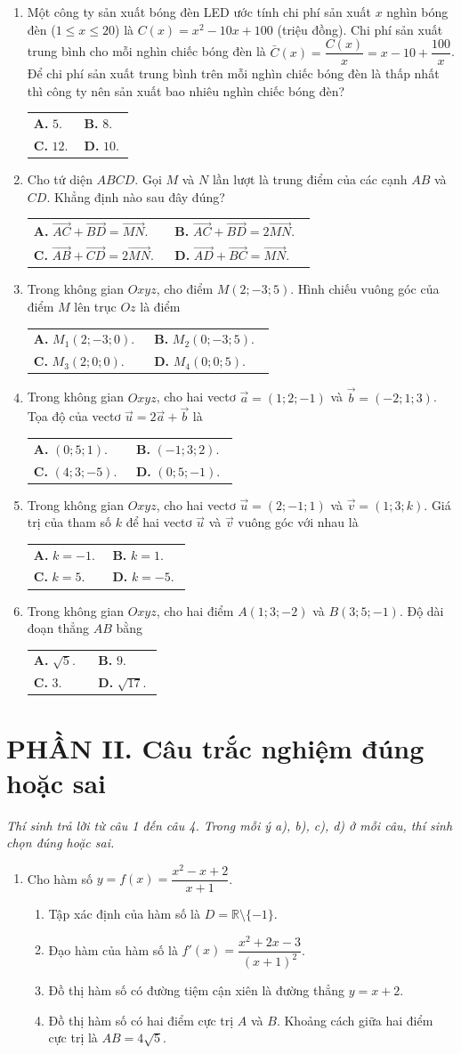\documentclass[12pt,a4paper]{article}
\makeatletter
\newcommand{\bonpa}[4]{\par\nobreak\smallskip\nobreak\noindent
\begin{tabular}{@{}p{0.47\linewidth}p{0.47\linewidth}@{}}
\textbf{A.} #1 & \textbf{B.} #2\\[8pt]
\textbf{C.} #3 & \textbf{D.} #4\end{tabular}}
\makeatother
\begin{document}
\newpage
\begin{enumerate}[start=7]
\item Một công ty sản xuất bóng đèn LED ước tính chi phí sản xuất $x$ nghìn bóng đèn ($1\le x\le 20$) là $C(x)=x^2-10x+100$ (triệu đồng). Chi phí sản xuất trung bình cho mỗi nghìn chiếc bóng đèn là $\bar{C}(x)=\dfrac{C(x)}{x}=x-10+\dfrac{100}{x}$. Để chi phí sản xuất trung bình trên mỗi nghìn chiếc bóng đèn là thấp nhất thì công ty nên sản xuất bao nhiêu nghìn chiếc bóng đèn?
\bonpa{$5$.}{$8$.}{$12$.}{$10$.}

\item Cho tứ diện $ABCD$. Gọi $M$ và $N$ lần lượt là trung điểm của các cạnh $AB$ và $CD$. Khẳng định nào sau đây đúng?
\bonpa{$\vec{AC}+\vec{BD}=\vec{MN}$.}{$\vec{AC}+\vec{BD}=2\vec{MN}$.}{$\vec{AB}+\vec{CD}=2\vec{MN}$.}{$\vec{AD}+\vec{BC}=\vec{MN}$.}

\item Trong không gian $Oxyz$, cho điểm $M(2;-3;5)$. Hình chiếu vuông góc của điểm $M$ lên trục $Oz$ là điểm
\bonpa{$M_1(2;-3;0)$.}{$M_2(0;-3;5)$.}{$M_3(2;0;0)$.}{$M_4(0;0;5)$.}

\item Trong không gian $Oxyz$, cho hai vectơ $\vec{a}=(1;2;-1)$ và $\vec{b}=(-2;1;3)$. Tọa độ của vectơ $\vec{u}=2\vec{a}+\vec{b}$ là
\bonpa{$(0;5;1)$.}{$(-1;3;2)$.}{$(4;3;-5)$.}{$(0;5;-1)$.}

\item Trong không gian $Oxyz$, cho hai vectơ $\vec{u}=(2;-1;1)$ và $\vec{v}=(1;3;k)$. Giá trị của tham số $k$ để hai vectơ $\vec{u}$ và $\vec{v}$ vuông góc với nhau là
\bonpa{$k=-1$.}{$k=1$.}{$k=5$.}{$k=-5$.}

\item Trong không gian $Oxyz$, cho hai điểm $A(1;3;-2)$ và $B(3;5;-1)$. Độ dài đoạn thẳng $AB$ bằng
\bonpa{$\sqrt{5}$.}{$9$.}{$3$.}{$\sqrt{17}$.}
\end{enumerate}

\vspace{3pt}
\section*{\large PHẦN II. Câu trắc nghiệm đúng hoặc sai}
\textit{Thí sinh trả lời từ câu 1 đến câu 4. Trong mỗi ý a), b), c), d) ở mỗi câu, thí sinh chọn đúng hoặc sai.}
\begin{enumerate}
\item Cho hàm số $y=f(x)=\dfrac{x^2-x+2}{x+1}$.
\begin{enumerate}
\item Tập xác định của hàm số là $D=\mathbb{R}\setminus\{-1\}$.
\item Đạo hàm của hàm số là $f'(x)=\dfrac{x^2+2x-3}{(x+1)^2}$.
\item Đồ thị hàm số có đường tiệm cận xiên là đường thẳng $y=x+2$.
\item Đồ thị hàm số có hai điểm cực trị $A$ và $B$. Khoảng cách giữa hai điểm cực trị là $AB=4\sqrt{5}$.
\end{enumerate}
\end{enumerate}
\end{document}
